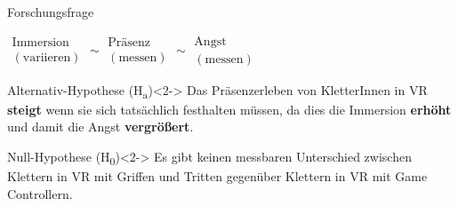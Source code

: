 \documentclass[11pt,aspectratio=169,
xcolor={table},
hyperref={
hidelinks,
pdfauthor={Peter Schulz},
pdftitle={Effects of Physical Interaction While Sport Climbing in Virtual Reality - Comparing Different Levels of Presence},
pdfsubject={Master Thesis},
pdfkeywords={Sport Climbing;Virtual Reality;Mixed Reality;Passive Haptics;Presence},
pdfencoding=auto},
url={obeyspaces,spaces,hyphens}]{beamer}
\theoremstyle{plain}
\newcommand{\backupend}{
	\addtocounter{framenumberappendix}{-\value{framenumber}}
	\addtocounter{framenumber}{\value{framenumberappendix}} 
}
\begin{document}
\begin{frame}{Forschungsfrage}
\begin{center}
\LARGE
$\substack{\text{Immersion}\\(\text{variieren})} \sim \substack{\text{Präsenz}\\(\text{messen})} \sim \substack{\text{Angst}\\(\text{messen})}$
\end{center}
\begin{center}
\begin{minipage}{0.7\textwidth}
	\begin{block}{Alternativ-Hypothese (H\textsubscript{a}\label{hyp:anxiety})}<2->
		Das \textcolor{tertiary}{Präsenz}erleben von KletterInnen in \gls{VR} \textbf{steigt} wenn sie sich tatsächlich festhalten müssen, da dies die \textcolor{tertiary}{Immersion} \textbf{erhöht} und damit die \textcolor{tertiary}{Angst} \textbf{vergrößert}.
	\end{block}
	\begin{block}{Null-Hypothese (H\textsubscript{0}\label{hyp:anxiety})}<2->
		Es gibt keinen messbaren Unterschied zwischen Klettern in \gls{VR} mit \textcolor{tertiary}{Griffen und Tritten} gegenüber Klettern in \gls{VR} mit \textcolor{tertiary}{Game Controllern}.
	\end{block}
\end{minipage}
\end{center}
\end{frame}

\backupend
	
\end{document}
